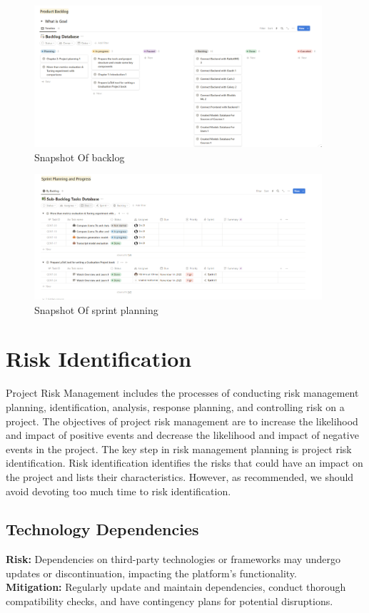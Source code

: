 \begin{figure}[h!]
	\centering
	\includegraphics[width=0.95\textwidth]{figures/snapshot-of-backlog-database.png}
	\caption{Snapshot Of backlog}
\end{figure}

\begin{figure}[h!]
	\centering
	\includegraphics[width=0.95\textwidth]{figures/snapshot-of-sprint-planning.png}
	\caption{Snapshot Of sprint planning}
\end{figure}

\section{Risk Identification}
Project Risk Management includes the processes of conducting 
risk management planning, identification, analysis, response 
planning, and controlling risk on a project. The objectives 
of project risk management are to increase the likelihood and 
impact of positive events and decrease the likelihood and impact 
of negative events in the project. The key step in risk management
planning is project risk identification. Risk identification
identifies the risks that could have an impact on the project 
and lists their characteristics. However, as recommended, we should
avoid devoting too much time to risk identification.

\subsection{Technology Dependencies}
\textbf{Risk:} Dependencies on third-party technologies or frameworks may undergo updates or discontinuation, impacting the platform's functionality. \\
\textbf{Mitigation:} Regularly update and maintain dependencies, conduct thorough compatibility checks, and have contingency plans for potential disruptions.

